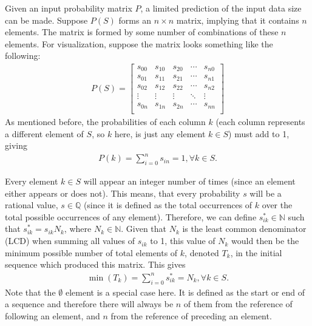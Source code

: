 Given an input probability matrix $P$, a limited prediction of the input data
size can be made. Suppose $P(S)$ forms an $n \times n$ matrix, implying that it contains $n$ elements. The matrix is formed by some number of combinations of these $n$ elements. For visualization, suppose the matrix looks something like the following:
\begin{align}
P(S) = \left[
\begin{matrix}
s_{00} & s_{10} & s_{20} & \cdots & s_{n0} \\
s_{01} & s_{11} & s_{21} & \cdots & s_{n1} \\
s_{02} & s_{12} & s_{22} & \cdots & s_{n2} \\
\vdots & \vdots & \vdots & \ddots & \vdots \\
s_{0n} & s_{1n} & s_{2n} & \cdots & s_{nn} \\
\end{matrix}\right]
\end{align}
As mentioned before, the probabilities of each column $k$ (each column represents a different element of $S$, so $k$ here, is just any element $k \in S$) must add to 1, giving
\begin{align}
P(k) = \sum_{i=0}^{n}s_{in} = 1, \forall k \in S.
\end{align}

Every element $k\in S$ will appear an integer number of times (since an element either appears or does not). This means, that every probability $s$ will be a rational value, $s\in\mathbb{Q}$ (since it is defined as the total occurrences of $k$ over the total possible occurrences of any element). Therefore, we can define $s^*_{ik}\in \mathbb{N}$ such that $s^*_{ik} = s_{ik}N_k$, where $N_k\in\mathbb{N}$. Given that $N_k$ is the least common denominator (LCD) when summing all values of $s_{ik}$ to 1, this value of $N_k$ would then be the minimum possible number of total elements of $k$, denoted $T_k$, in the initial sequence which produced this matrix. This gives
\begin{align}
\min (T_k) = \sum_{i=0}^{n}s^*_{ik} = N_k, \forall k \in S.
\end{align}
Note that the $\emptyset$ element is a special case here. It is defined as the start or end of a sequence and therefore there will always be $n$ of them from the reference of following an element, and $n$ from the reference of preceding an element.

